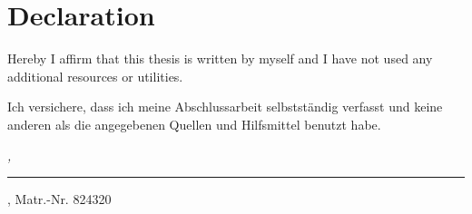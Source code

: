 %
\chapter*{Declaration}
\label{sec:declaration}
\thispagestyle{empty}

Hereby I affirm that this thesis is written by myself and I have not used any 
additional resources or utilities.

\begin{center}
	\hrulefill
\end{center}

Ich versichere, dass ich meine Abschlussarbeit selbstständig verfasst und keine 
anderen als die angegebenen Quellen und Hilfsmittel benutzt habe.

\bigskip

\noindent\textit{\thesisUniversityCity, \thesisDate}

\smallskip

\begin{flushright}
	\begin{minipage}{5cm}
		\rule{\textwidth}{1pt}
		\centering\thesisName, Matr.-Nr. 824320
	\end{minipage}
\end{flushright}

